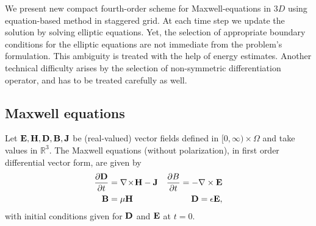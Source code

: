 \documentclass[12pt,reqno]{amsart}
\newcommand{\R}{\mathbb{R}}
\newcommand{\e}{{\bf E}}
\newcommand{\h}{{\bf H}}
\theoremstyle{definition}
\numberwithin{equation}{section}
\begin{document}
	We present new compact fourth-order scheme for Maxwell-equations in $3D$ using equation-based method in staggered grid.
	At each time step we update the solution by solving  elliptic equations. Yet, the selection of appropriate boundary conditions for the elliptic equations are not immediate from the problem's formulation. This ambiguity is treated with the help of energy estimates.
	Another technical   difficulty   arises by the selection of non-symmetric differentiation operator, and has to be treated carefully as well.
	
	\subsection{Maxwell equations}
	Let $\e,\h,\bf{D},\bf{B},\bf{J}$ be (real-valued) vector fields defined in  $[0,\infty)\times\Omega$ and take values in $\R^3$.
	The Maxwell equations (without polarization), in first order differential vector form, are given by
	\begin{align*}
		\frac{\partial \bf{D}}{\partial t} &= \nabla \!\times\! \bf{H} - \bf{J} &
		\frac{\partial B}{\partial t}=-\nabla\times \e &\\
		\bf{B} &= \mu \bf{H} & \bf{D} = \epsilon \bf{E},
	\end{align*}
	with initial conditions given for $\bf{D}$ and $\bf{E}$ at $t=0$.
\end{document}
